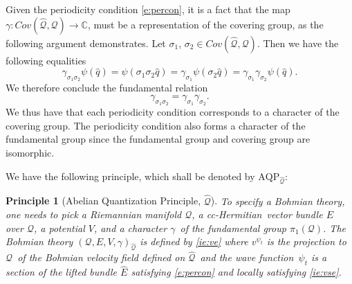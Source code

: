 \documentclass[11pt]{article}
\newtheorem{principle}{Principle}
\theoremstyle{remark}
\begin{document}
Given the periodicity condition \eqref{e:percon}, it is a fact that
 the map $\gamma: \ensuremath{Cov(\ensuremath{\widehat{\ensuremath{\mathcal{Q}}}}, \ensuremath{\mathcal{Q}})} \to \ensuremath{\mathbb{C}}$,  must
be a  representation of
the covering group, as the following argument demonstrates. 
 Let $\ensuremath{\ensuremath{\sigma}_{1}}$, $\ensuremath{\ensuremath{\sigma}_{2}} \in  \ensuremath{Cov(\ensuremath{\widehat{\ensuremath{\mathcal{Q}}}}, \ensuremath{\mathcal{Q}})}$. Then
we have the following equalities
\begin{equation*} 
\ensuremath{\gamma_{\ensuremath{\ensuremath{\sigma}_{1}} \ensuremath{\ensuremath{\sigma}_{2}}}} \ensuremath{\psi} (\ensuremath{\hat{q}}) 
= \ensuremath{\psi}(\ensuremath{\ensuremath{\sigma}_{1}} \ensuremath{\ensuremath{\sigma}_{2}} \ensuremath{\hat{q}}) 
= \ensuremath{\gamma_{\ensuremath{\ensuremath{\sigma}_{1}}}} \ensuremath{\psi}(\ensuremath{\ensuremath{\sigma}_{2}} \ensuremath{\hat{q}})
= \ensuremath{\gamma_{\ensuremath{\ensuremath{\sigma}_{1}}}}\ensuremath{\gamma_{\ensuremath{\ensuremath{\sigma}_{2}}}} \ensuremath{\psi}(\ensuremath{\hat{q}}).
\end{equation*}
We therefore conclude the fundamental relation
 \begin{equation} \label{e:ccc}
\ensuremath{\gamma_{\ensuremath{\ensuremath{\sigma}_{1}} \ensuremath{\ensuremath{\sigma}_{2}}}} = \ensuremath{\gamma_{\ensuremath{\ensuremath{\sigma}_{1}}}}\ensuremath{\gamma_{\ensuremath{\ensuremath{\sigma}_{2}}}}.
\end{equation}
We thus have that  
each periodicity condition corresponds to a  character
 of the covering group. The periodicity
condition also forms a character of the fundamental group since the
fundamental group and covering group are isomorphic.


We have the following principle, which shall be denoted by \ensuremath{\text{AQP}_{\ensuremath{\widehat{\ensuremath{\mathcal{Q}}}}}}: 
\begin{principle}[Abelian Quantization Principle, \ensuremath{\widehat{\ensuremath{\mathcal{Q}}}}] 
To specify a Bohmian theory, one needs to pick a Riemannian manifold
 $\ensuremath{\mathcal{Q}}$, a 
 cc-Hermitian\ vector bundle $E$ over
 \ensuremath{\mathcal{Q}}, a potential $V$, and a character \ensuremath{\gamma}\
 of the fundamental group \ensuremath{\pi_1 ({\ensuremath{\mathcal{Q}}})}.
 The Bohmian
 theory $(\ensuremath{\mathcal{Q}}, E, V, \ensuremath{\gamma})_{\ensuremath{\widehat{\ensuremath{\mathcal{Q}}}}}$ is defined by 
\eqref{ie:ve}
where $v^{\ensuremath{\psi}_t}$ is the projection to \ensuremath{\mathcal{Q}}\ of the Bohmian velocity field
 defined on
 \ensuremath{\widehat{\ensuremath{\mathcal{Q}}}}\ and the wave function\
$\ensuremath{\psi}_t$ is a section of the lifted bundle $\ensuremath{\widehat{E}}$ satisfying
 \eqref{e:percon} and locally satisfying  \eqref{ie:vse}. 
\end{principle}
\end{document}
